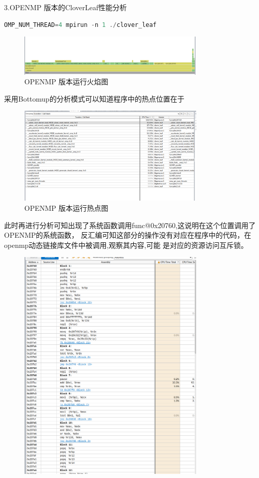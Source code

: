 \documentclass{article}
\begin{document}
\begin{CJK}{UTF8}{gbsn}
3.OPENMP 版本的CloverLeaf性能分析
\begin{lstlisting}[language=C++]
    OMP_NUM_THREAD=4 mpirun -n 1 ./clover_leaf
\end{lstlisting} 
\begin{figure}[H]
    \centering
    \includegraphics[width=0.8\textwidth]{./call7.png}
    \caption{OPENMP 版本运行火焰图}
\end{figure}
采用Bottomup的分析模式可以知道程序中的热点位置在于 \\
\begin{figure}[H]
    \centering
    \includegraphics[width=0.8\textwidth]{./call8.png}
    \caption{OPENMP 版本运行热点图}
\end{figure}
此时再进行分析可知出现了系统函数调用func@0x20760,这说明在这个位置调用了OPENMP的系统函数，
反汇编可知这部分的操作没有对应在程序中的代码，在openmp动态链接库文件中被调用,观察其内容,可能
是对应的资源访问互斥锁。 \\
\begin{figure}[H]
    \centering
    \includegraphics[width=0.8\textwidth]{./call9.png}

\end{figure}
\end{CJK}
\end{document}
